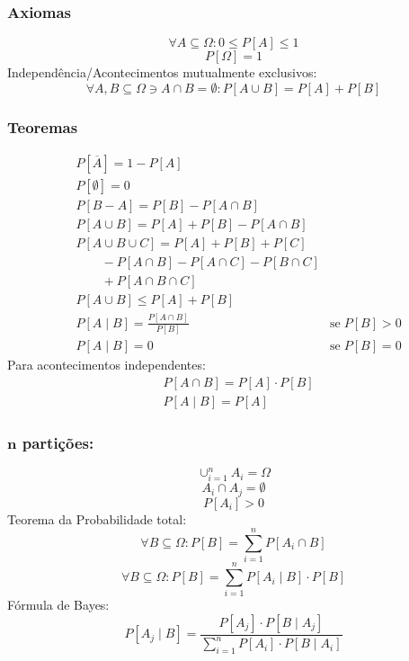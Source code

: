 \documentclass[a4paper]{article}
\begin{document}
\begin{multicols}{3}
\subsubsection{Axiomas}
$$\forall A \subseteq \Omega: 0 \leq P[A] \leq 1$$
$$P[\Omega] = 1$$
Independência/Acontecimentos mutualmente exclusivos:
$$\forall A, B \subseteq \Omega \ni A \cap B = \emptyset: P[A \cup B] = P[A] + P[B]$$
\subsubsection{Teoremas}
\begin{align*}
  &P[\overline{A}] = 1 - P[A] \\
  &P[\emptyset] = 0 \\
  &P[B-A] = P[B] - P[A \cap B] \\
  &P[A \cup B] = P[A] + P[B] - P[A \cap B] \\
  & P[A \cup B \cup C] = P[A] + P[B] + P[C] \\ 
  &\qquad - P[A \cap B] - P[A \cap C] - P[B \cap C] \\ 
  &\qquad + P[A \cap B \cap C] \\
  &P[A \cup B] \leq P[A] + P[B] \\
  &P[A \mid B] = \frac{P[A \cap B]}{P[B]} & \text{se} \; P[B] > 0 \\
  &P[A \mid B] = 0 & \text{se} \; P[B] = 0
\end{align*}
Para acontecimentos independentes:
\begin{align*}
& P[A \cap B] = P[A] \cdot P[B] \\
& P[A \mid B] = P[A]
\end{align*}
\subsubsection{$\mathbold{n}$ partições:} 
$$\cup_{i=1}^n A_i = \Omega$$
$$A_i \cap A_j = \emptyset$$
$$P[A_i] > 0$$
Teorema da Probabilidade total:
$$\forall B \subseteq \Omega: P[B] = \sum_{i=1}^n P[A_i \cap B]$$
$$\forall B \subseteq \Omega: P[B] = \sum_{i=1}^n P[A_i \mid B] \cdot P[B]$$
Fórmula de Bayes:
$$P[A_j \mid B] = \frac{P[A_j] \cdot P[B \mid A_j]}{\sum_{i=1}^n P[A_i] \cdot P[B \mid A_i]}$$
\pagebreak

\end{multicols}
\end{document}
